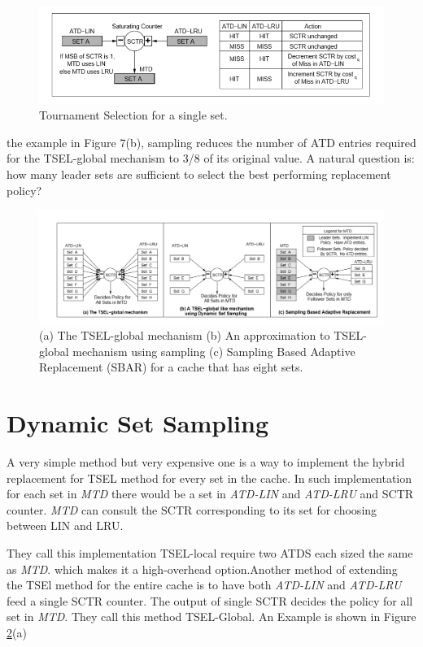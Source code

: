 \documentclass{report}
\begin{document}
\begin{figure}[h!]
\includegraphics[width=1\textwidth]{./fig14}
\caption{Tournament Selection for a single set. }
\label{fig14}
\end{figure}

the example in Figure 7(b), sampling reduces the number of ATD entries required for the TSEL-global mechanism to 3/8 of its original value. A natural question is: how many leader sets are sufficient to select the best performing replacement policy? 


\begin{figure}[h!]
\includegraphics[width=1\textwidth]{./fig15}
\caption{ (a) The TSEL-global mechanism (b) An approximation to TSEL-global mechanism using sampling (c) Sampling Based Adaptive Replacement (SBAR) for a cache that has eight sets.}
\label{fig15}
\end{figure}

\vspace{.8cm}
\section{ Dynamic Set Sampling}
A very simple method but very expensive one is a way to implement the hybrid replacement for TSEL method for every set in the cache. In such implementation for each set in \emph{MTD} there would be a set in \emph{ATD-LIN} and \emph{ATD-LRU} and SCTR counter. \emph{MTD} can consult the SCTR corresponding to its set for choosing between LIN and LRU. 

They call this implementation TSEL-local require two ATDS each sized the same as \emph{MTD}. which makes it a high-overhead option.Another method of extending the TSEl method for the entire cache is to have both \emph{ATD-LIN} and \emph{ATD-LRU} feed a single SCTR counter. The output of single SCTR decides the policy for all set in \emph{MTD}. They call this method TSEL-Global.
An Example is shown in Figure \ref{fig15}(a)
\end{document}
